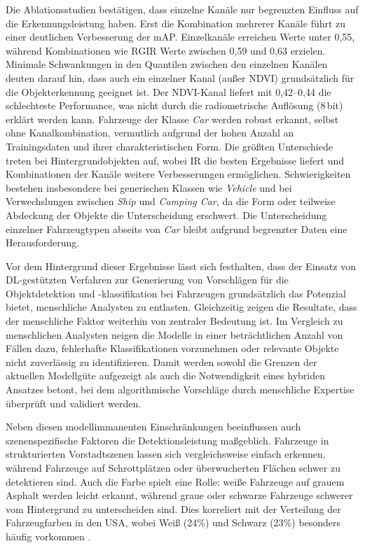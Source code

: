 Die Ablationsstudien bestätigen, dass einzelne Kanäle nur begrenzten Einfluss auf die Erkennungsleistung haben. Erst die Kombination mehrerer Kanäle führt zu einer deutlichen Verbesserung der mAP. Einzelkanäle erreichen Werte unter 0,55, während Kombinationen wie RGIR Werte zwischen 0,59 und 0,63 erzielen. Minimale Schwankungen in den Quantilen zwischen den einzelnen Kanälen deuten darauf hin, dass auch ein einzelner Kanal (außer NDVI) grundsätzlich für die Objekterkennung geeignet ist. Der NDVI-Kanal liefert mit 0,42–0,44 die schlechteste Performance, was nicht durch die radiometrische Auflösung (8\,bit) erklärt werden kann. Fahrzeuge der Klasse \textit{Car} werden robust erkannt, selbst ohne Kanalkombination, vermutlich aufgrund der hohen Anzahl an Trainingsdaten und ihrer charakteristischen Form. Die größten Unterschiede treten bei Hintergrundobjekten auf, wobei IR die besten Ergebnisse liefert und Kombinationen der Kanäle weitere Verbesserungen ermöglichen. Schwierigkeiten bestehen insbesondere bei generischen Klassen wie \textit{Vehicle} und bei Verwechslungen zwischen \textit{Ship} und \textit{Camping Car}, da die Form oder teilweise Abdeckung der Objekte die Unterscheidung erschwert. Die Unterscheidung einzelner Fahrzeugtypen abseits von \textit{Car} bleibt aufgrund begrenzter Daten eine Herausforderung.

Vor dem Hintergrund dieser Ergebnisse lässt sich festhalten, dass der Einsatz von \acrshort{DL}-gestützten Verfahren zur Generierung von Vorschlägen für die Objektdetektion und -klassifikation bei Fahrzeugen grundsätzlich das Potenzial bietet, menschliche Analysten zu entlasten. Gleichzeitig zeigen die Resultate, dass der menschliche Faktor weiterhin von zentraler Bedeutung ist. Im Vergleich zu menschlichen Analysten neigen die Modelle in einer beträchtlichen Anzahl von Fällen dazu, fehlerhafte Klassifikationen vorzunehmen oder relevante Objekte nicht zuverlässig zu identifizieren. Damit werden sowohl die Grenzen der aktuellen Modellgüte aufgezeigt als auch die Notwendigkeit eines hybriden Ansatzes betont, bei dem algorithmische Vorschläge durch menschliche Expertise überprüft und validiert werden.

Neben diesen modellimmanenten Einschränkungen beeinflussen auch szenenspezifische Faktoren die Detektionsleistung maßgeblich. Fahrzeuge in strukturierten Vorstadtszenen lassen sich vergleichsweise einfach erkennen, während Fahrzeuge auf Schrottplätzen oder überwucherten Flächen schwer zu detektieren sind. Auch die Farbe spielt eine Rolle: weiße Fahrzeuge auf grauem Asphalt werden leicht erkannt, während graue oder schwarze Fahrzeuge schwerer vom Hintergrund zu unterscheiden sind. Dies korreliert mit der Verteilung der Fahrzeugfarben in den USA, wobei Weiß (24\%) und Schwarz (23\%) besonders häufig vorkommen \cite{abc_utah}.

